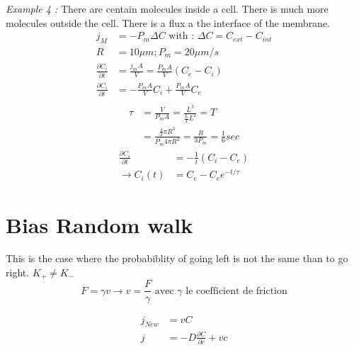 \documentclass[10pt,a4paper]{article}
\begin{document}
\emph{Example 4 :} There are centain molecules inside a cell. There is much more molecules outside the cell. There is a flux a the interface of the membrane.
\begin{align*}
    j_M &= -P_m \Delta C \text{ with : } \Delta C = C_{ext} - C_{int}\\
    R &= 10 \mu m ; P_m = 20 \mu m/s\\
    \frac{\partial C_i}{\partial t} &= \frac{j_m A}{V} = \frac{P_mA}{V} (C_e -C_i)\\
    \frac{\partial C_i}{\partial t} &= -\frac{P_m A}{V}C_i + \frac{P_m A}{V}C_e \\
\end{align*}
\begin{align*}
    \tau &= \frac{V}{P_m A} = \frac{L^3}{\frac{L}{T}{L^2}} = T\\
    &= \frac{\frac{4}{3}\pi R^3}{P_m 4 \pi R^2} = \frac{R}{3P_m} = \frac{1}{6}sec
\end{align*}
\begin{align*}
    \frac{\partial C_i}{\partial t} &= -\frac{1}{t}(C_i - C_e) \\
    \rightarrow C_i(t) &= C_e - C_e e^{-t/\tau}
\end{align*}

\section{Bias Random walk}

This is the case where the probabiblity of going left is not the same than to go right. $K_+ \not= K_-$
\[ F = \gamma v \rightarrow v=\frac{F}{\gamma} \text{ avec } \gamma \text{ le coefficient de friction}\]

\begin{align*}
    j_{New} &= vC\\
    j &= -D \frac{\partial C}{\partial c} + vc\\
\end{align*}
\end{document}

